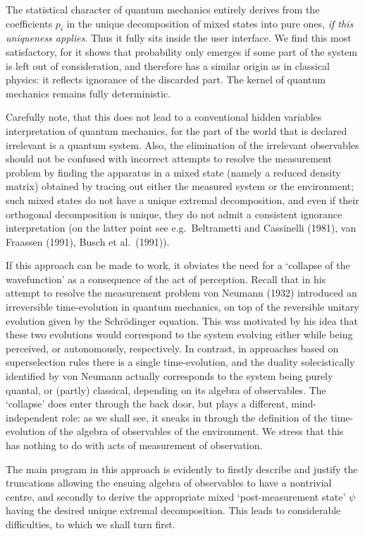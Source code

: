 \documentclass[12pt,titlepage]{article}
\begin{document}
The statistical character of quantum mechanics entirely derives from the
coefficients $p_i$ in the
unique decomposition of mixed states into pure ones, {\em if this uniqueness
applies}. Thus it fully
sits inside the user interface. We find this most satisfactory, for it  shows
that probability only
emerges if some part of the system is left out of consideration, and therefore
has a similar
origin as in classical physics: it reflects ignorance   of the discarded part.
 The kernel
of quantum mechanics remains fully deterministic.

 Carefully note, that this does not lead to a
conventional hidden variables interpretation of quantum mechanics, for the part
of the world that is
declared irrelevant is  a quantum system. Also, the elimination of the
irrelevant
observables should not be confused with incorrect attempts to resolve the
measurement problem by
finding the apparatus in a mixed state (namely a reduced density matrix)
obtained by tracing out
either the measured system or the environment; such mixed states do not have a
unique
extremal decomposition, and even if their orthogonal decomposition is unique,
they do not admit a
consistent ignorance interpretation (on the latter point see e.g.\ Beltrametti
and Cassinelli
(1981), van Fraassen (1991), Busch et al.\ (1991)).


If this approach can be made to work, it obviates the need for a `collapse of
the wavefunction' as a
consequence of the act of perception. Recall that in his attempt to resolve the
measurement problem
von Neumann (1932)   introduced an irreversible time-evolution in quantum
mechanics, on top of the reversible unitary evolution given by the
Schr\"{o}dinger equation.
This was motivated by his idea that these two evolutions would  correspond to
the system evolving either
while being perceived, or autonomously, respectively. In contrast, in
approaches based on
superselection rules there is a single time-evolution, and the duality
solecistically identified by von
Neumann actually corresponds to the system being purely quantal, or (partly)
classical, depending
on its algebra of observables. The `collapse' does enter through the back door,
but plays a
different, mind-independent role: as we shall see, it sneaks in through the
definition of the
time-evolution of the algebra of observables of the environment. We stress that
this has nothing to
do with acts of measurement of observation.

The main program in this approach is evidently to firstly describe and justify
the truncations
allowing the ensuing algebra of observables to have a nontrivial centre, and
secondly to derive the
appropriate mixed `post-measurement state' $\psi$ having the desired unique
extremal decomposition.
This leads to considerable difficulties, to which we shall turn first.
\end{document}
